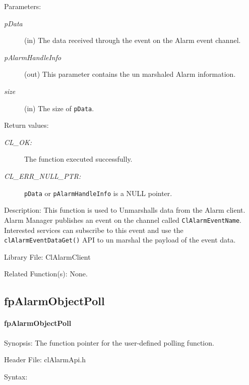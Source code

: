 \begin{flushleft}
\begin{Desc}
\begin{verbatim}
\end{verbatim}
\normalsize
\end{Desc}
\begin{Desc}
\item[Parameters:]
\begin{description}
\item[{\em *pData}](in) The data received through the event on the Alarm event channel.
\item[{\em *pAlarmHandleInfo}](out) This parameter contains the un marshaled Alarm information.
\item[{\em size}](in) The size of {\tt{pData}}.
\end{description}
\end{Desc}
\begin{Desc}
\item[Return values:]
\begin{description}
\item[{\em CL\_\-OK:}]The function executed successfully. 
\item[{\em CL\_\-ERR\_\-NULL\_\-PTR:}] {\tt{pData}} or {\tt{pAlarmHandleInfo}} is a NULL pointer.
\end{description}
\end{Desc}
\begin{Desc}
\item[Description:] 
This function is used to Unmarshalls data from the Alarm client. Alarm Manager publishes an event on the channel called
{\tt{ClAlarmEventName}}. Interested services can subscribe to this event and use the {\tt{clAlarmEventDataGet()}} API to un marshal the
payload of the event data.
\end{Desc}
\begin{Desc}
\item[Library File:]Cl\-Alarm\-Client\end{Desc}
\begin{Desc}
\item[Related Function(s):]None. \end{Desc}




\newpage

\subsection{fpAlarmObjectPoll}
\hypertarget{pageam103}{}\paragraph{fp\-Alarm\-Object\-Poll}\label{pageam103}
\begin{Desc}
\item[Synopsis:]The function pointer for the user-defined polling function.\end{Desc}
\begin{Desc}
\item[Header File:]clAlarmApi.h\end{Desc}
\begin{Desc}
\item[Syntax:]


\end{Desc}
\end{flushleft}
